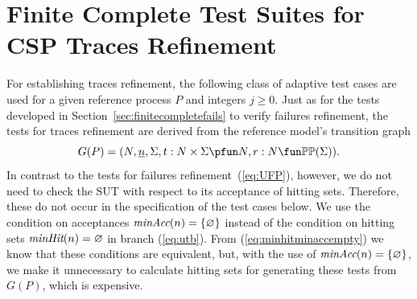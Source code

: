 \documentclass[3p,times]{elsarticle}
\newcommand{\epass}{{\text{\it pass}}}
\newcommand{\efail}{{\text{\it fail}}}
\newcommand{\ii}[1]{\underline{#1}}
\newcommand{\minaccs}{\text{\it minAcc}}
\newcommand{\minhits}{\text{\it minHit}}
\begin{document}
\section{Finite Complete Test Suites for CSP Traces Refinement}
\label{sec:finitecomplete}

For establishing traces refinement, the following class of adaptive test
cases are used for a given reference process $P$ and  integers $j \ge 0$.
Just as for the tests developed  in Section~\ref{sec:finitecompletefails} to
verify failures refinement, the tests for traces refinement are derived from
the reference model's transition graph
$$
G(P) = ( N, \ii n, \Sigma, t : N\times\Sigma \pfun N, r : N \fun \mathbb{P}\mathbb{P}(\Sigma)).
$$
In contrast to the tests for failures refinement~(\ref{eq:UFP}), however, we
do not need to check the SUT with respect to its acceptance of hitting sets.
Therefore, these do not occur in the specification of the test cases below.
We use the condition on acceptances $\minaccs(n) = \{ \varnothing \}$ instead
of the condition on hitting sets $\minhits(n) = \varnothing$ in branch
(\ref{eq:utb}). From (\ref{eq:minhitminaccempty}) we know that these
conditions are equivalent, but, with the use of $\minaccs(n) = \{ \varnothing
\}$, \pagebreak we make it unnecessary to calculate hitting sets for
generating these tests from $G(P)$, which is expensive.

\end{document}
